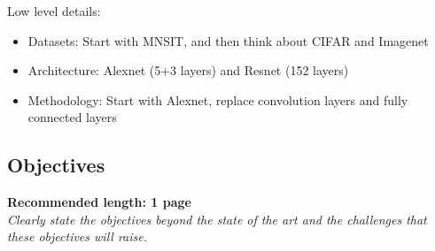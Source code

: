 Low level details:
\begin{itemize}
	\item Datasets: Start with MNSIT, and then think about CIFAR and Imagenet
	\item Architecture: Alexnet (5+3 layers) and Resnet (152 layers)
	\item Methodology: Start with Alexnet, replace convolution layers and fully connected layers
\end{itemize}
%	


\subsection*{Objectives}
\textbf{Recommended length: 1 page}\\

\textit{Clearly state the objectives beyond the state of the art and the challenges that these objectives will raise.}


